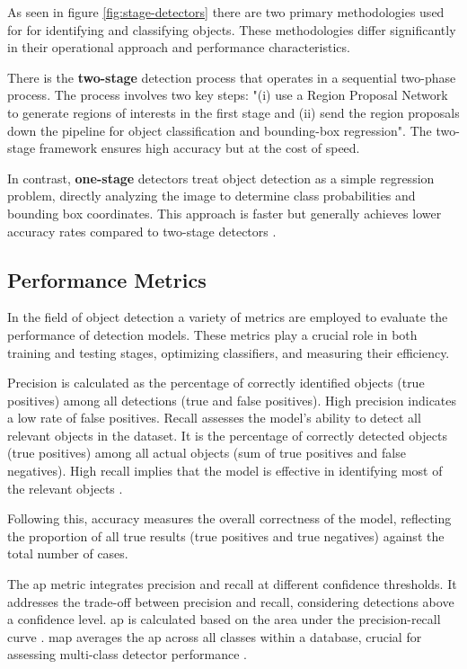 As seen in figure \ref{fig:stage-detectors} there are two primary methodologies used for for identifying and 
classifying objects.
These methodologies differ significantly in their operational approach and performance characteristics.

There is the \textbf{two-stage} detection process that operates in a sequential two-phase process. The process involves two key steps: "(i) use a Region Proposal Network to generate regions of interests in the first stage and (ii) send the region proposals down the pipeline for object classification and bounding-box regression"\cite{rfc21}. The two-stage framework ensures high accuracy but at the cost of speed.

In contrast, \textbf{one-stage} detectors treat object detection as a simple regression problem, directly analyzing the image to determine class probabilities and bounding box coordinates. This approach is faster but generally achieves lower accuracy rates compared to two-stage detectors \cite{rfc23}.

\subsection{Performance Metrics}
In the field of object detection a variety of metrics are employed to evaluate the performance of detection models. These metrics play a crucial role in both training and testing stages, optimizing classifiers, and measuring their efficiency. 

Precision is calculated as the percentage of correctly identified objects (true positives) among all detections (true and false positives). High precision indicates a low rate of false positives. Recall assesses the model's ability to detect all relevant objects in the dataset. It is the percentage of correctly detected objects (true positives) among all actual objects (sum of true positives and false negatives). High recall implies that the model is effective in identifying most of the relevant objects \cite{rfc25}.

Following this, accuracy measures the overall correctness of the model, reflecting the proportion of all true results (true positives and true negatives) against the total number of cases.

The \ac{ap} metric integrates precision and recall at different confidence thresholds. It addresses the trade-off between precision and recall, considering detections above a confidence level. \ac{ap} is calculated based on the area under the precision-recall curve \cite{rfc25}. \ac{map} averages the \ac{ap} across all classes within a database, crucial for assessing multi-class detector performance \cite{rfc24}. 

